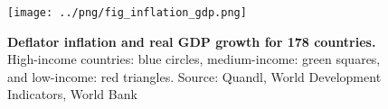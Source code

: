 \begin{figure}[h]
\caption{\label{fig:money_gdp} \textbf{Deflator inflation and real GDP growth for 178 countries.} High-income countries: blue circles, medium-income: green squares, and low-income: red triangles. {\tiny Source: Quandl, World Development Indicators, World Bank}}
\hspace*{-.5cm}\texttt{[image: ../png/fig\_inflation\_gdp.png]}
\end{figure}
